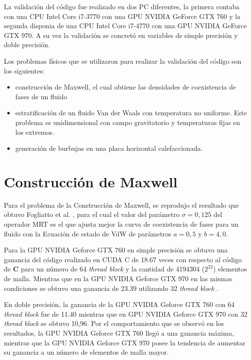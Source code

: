 La validación del código fue realizado en dos PC diferentes, la primera contaba con una CPU Intel Core i7-3770 con una GPU NVIDIA GeForce GTX 760 y la segunda disponia de una CPU Intel Core i7-4770 con una GPU NVIDIA GeForce GTX 970. A su vez la validación se concretó en variables de simple precisión y doble precisión.

Los problemas físicos  que se utilizaron para realizar la validación del código son los siguientes:

\begin{itemize}
    
    \item construcción de Maxwell, el cual obtiene las densidades de coexistencia de fases de un fluido 

    \item estratificación de un fluido Van der Waals con temperatura no uniforme. Este problema es unidimensional con campo gravitatorio y temperaturas fijas en los extremos.

    \item generación de burbujas en una placa horizontal calefaccionada.

\end{itemize}

\section{Construcción de Maxwell}

Para el problema de la Construcción de Maxwell, se reprodujo el resultado que obtuvo Fogliatto et al. \cite{fogliatto2019simulation}, para el cual el valor del parámetro $\sigma = 0,125$ del operador MRT es el que ajusta mejor la curva de coexistencia de fases para un fluido con la Ecuación de estado de VdW de parámetros $ a = 0,5 $ y $ b = 4,0 $. 

Para la GPU NVIDIA Geforce GTX 760 en simple precisión se obtuvo una ganancia del código realizado en \textsc{CUDA C} de 18.67 veces con respecto al código de \textbf{C} para un número de 64 \textit{thread block} y la cantidad de 4194304 ($2^{22}$) elementos de malla. Mientras que en la  GPU NVIDIA Geforce GTX 970 en las mismas condiciones se obtuvo una ganancia de 23.39 utilizando 32 \textit{thread block} .

En doble precisión, la ganancia de la GPU NVIDIA Geforce GTX 760 con 64 \textit{thread block} fue de 11.40 mientras que en GPU NVIDIA Geforce GTX 970 con 32 \textit{thread block} se obtuvo 10,96. Por el comportamiento que se observó en los resultados, la GPU NVIDIA Geforce GTX 760 llegó a una ganancia máxima, mientras que la GPU NVIDIA Geforce GTX 970 posee la tendencia de aumentar su ganancia a un número de elementos de malla mayor.

